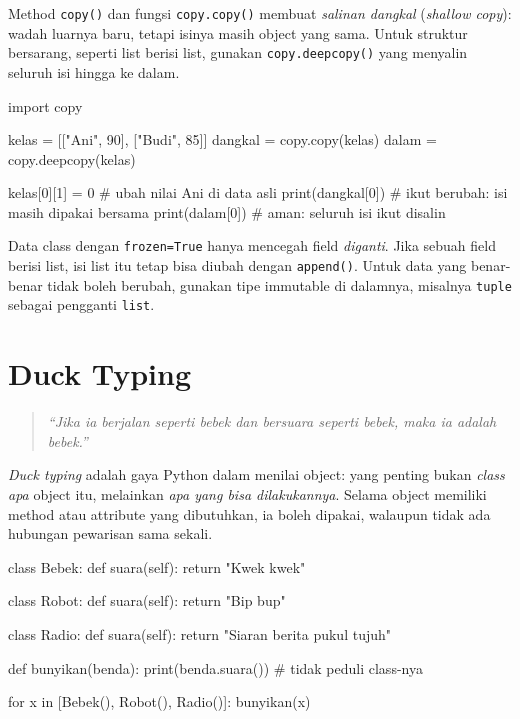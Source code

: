 Method \texttt{copy()} dan fungsi \texttt{copy.copy()} membuat \emph{salinan dangkal} (\emph{shallow copy}): wadah luarnya baru, tetapi isinya masih object yang sama. Untuk struktur bersarang, seperti list berisi list, gunakan \texttt{copy.deepcopy()} yang menyalin seluruh isi hingga ke dalam.

\begin{kode}
import copy

kelas = [["Ani", 90], ["Budi", 85]]
dangkal = copy.copy(kelas)
dalam = copy.deepcopy(kelas)

kelas[0][1] = 0          # ubah nilai Ani di data asli
print(dangkal[0])        # ikut berubah: isi masih dipakai bersama
print(dalam[0])          # aman: seluruh isi ikut disalin
\end{kode}

\begin{keluaran}
['Ani', 0]
['Ani', 90]
\end{keluaran}

\begin{penting}
Data class dengan \texttt{frozen=True} hanya mencegah field \emph{diganti}. Jika sebuah field berisi list, isi list itu tetap bisa diubah dengan \texttt{append()}. Untuk data yang benar-benar tidak boleh berubah, gunakan tipe immutable di dalamnya, misalnya \texttt{tuple} sebagai pengganti \texttt{list}.
\end{penting}

\section{Duck Typing}

\begin{quote}
\itshape ``Jika ia berjalan seperti bebek dan bersuara seperti bebek, maka ia adalah bebek.''
\end{quote}

\emph{Duck typing} adalah gaya Python dalam menilai object: yang penting bukan \emph{class apa} object itu, melainkan \emph{apa yang bisa dilakukannya}. Selama object memiliki method atau attribute yang dibutuhkan, ia boleh dipakai, walaupun tidak ada hubungan pewarisan sama sekali.

\begin{kode}
class Bebek:
    def suara(self):
        return "Kwek kwek"

class Robot:
    def suara(self):
        return "Bip bup"

class Radio:
    def suara(self):
        return "Siaran berita pukul tujuh"

def bunyikan(benda):
    print(benda.suara())        # tidak peduli class-nya

for x in [Bebek(), Robot(), Radio()]:
    bunyikan(x)
\end{kode}


